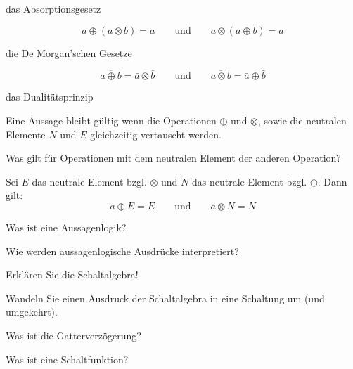 \documentclass
[
  draft    = true,
  fontsize = 11pt,
  parskip  = half-,
  BCOR     = 0pt,
  DIV      = 11,
  ngerman,
  dvipsnames
]
{scrartcl}
\begin{document}
\begin{mytemize}
\begin{mytemize}
\begin{evelyn}
            \end{evelyn}
          \item das Absorptionsgesetz
            \begin{evelyn}
                \begin{equation*}
                    a\oplus(a\otimes b)=a
                    \qquad\text{und}\qquad
                    a\otimes(a\oplus b)=a
                \end{equation*}
            \end{evelyn}
          \item die De Morgan'schen Gesetze
            \begin{evelyn}
                \begin{equation*}
                    \overline{a\oplus b}=\bar{a}\otimes\bar{b}
                    \qquad\text{und}\qquad
                    \overline{a\otimes b}=\bar{a}\oplus\bar{b}
                \end{equation*}
            \end{evelyn}
          \item das Dualitätsprinzip
            \begin{evelyn}
                Eine Aussage bleibt gültig wenn die Operationen $\oplus$ und $\otimes$, sowie die neutralen Elemente $N$ und $E$ gleichzeitig vertauscht werden.
            \end{evelyn}
        \end{mytemize}
  \item Was gilt für Operationen mit dem neutralen Element der anderen Operation?
        \begin{evelyn}
            Sei $E$ das neutrale Element bzgl. $\otimes$ und $N$ das neutrale Element bzgl. $\oplus$. Dann gilt:
                \begin{equation*}
                    a\oplus E=E
                    \qquad\text{und}\qquad
                    a\otimes N=N
                \end{equation*}
        \end{evelyn}
  \item Was ist eine Aussagenlogik?
  \item Wie werden aussagenlogische Ausdrücke interpretiert?
  \item Erklären Sie die Schaltalgebra!
  \item Wandeln Sie einen Ausdruck der Schaltalgebra in eine Schaltung um (und umgekehrt).
  \item Was ist die Gatterverzögerung?
  \item Was ist eine Schaltfunktion?

\end{mytemize}
\end{document}
